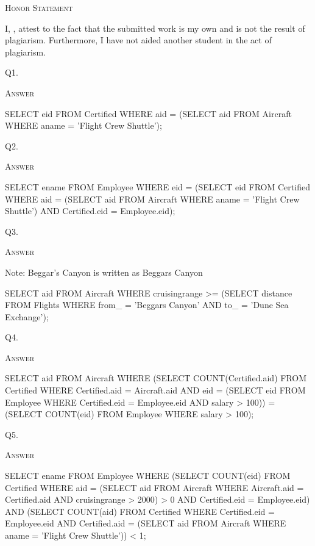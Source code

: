 



\begin{center}
  \textsc{Honor Statement}
\end{center}
I, ,
attest to the fact that the submitted work is my own and
is not the result of plagiarism.
Furthermore, I have not aided another student in the act of
plagiarism.



\newpage
Q1. 

\textsc{Answer}
\begin{answercode}
SELECT eid FROM Certified WHERE
aid = (SELECT aid FROM Aircraft WHERE aname = 'Flight Crew Shuttle');
\end{answercode}




Q2. 

\textsc{Answer}
\begin{answercode}
SELECT ename FROM Employee WHERE
eid = (SELECT eid FROM Certified WHERE
    aid = (SELECT aid FROM Aircraft WHERE
           aname = 'Flight Crew Shuttle')
       AND Certified.eid = Employee.eid);
\end{answercode}


\newpage
Q3. 

\textsc{Answer}
\begin{answercode}
Note: Beggar's Canyon is written as Beggars Canyon

SELECT aid FROM Aircraft WHERE
cruisingrange >= (SELECT distance FROM Flights WHERE
from_ = 'Beggars Canyon' AND to_ = 'Dune Sea Exchange');
\end{answercode}


Q4. 

\textsc{Answer}
\begin{answercode}
SELECT aid FROM Aircraft WHERE
(SELECT COUNT(Certified.aid) FROM Certified WHERE
Certified.aid = Aircraft.aid AND eid =
(SELECT eid FROM Employee WHERE Certified.eid = Employee.eid
AND salary > 100)) = (SELECT COUNT(eid) FROM Employee
WHERE salary > 100);
\end{answercode}


\newpage

Q5. 

\textsc{Answer}
\begin{answercode}
SELECT ename FROM Employee WHERE (SELECT COUNT(eid) FROM Certified WHERE
aid = (SELECT aid FROM Aircraft WHERE Aircraft.aid = Certified.aid
AND cruisingrange > 2000) > 0 AND Certified.eid = Employee.eid)
AND
(SELECT COUNT(aid) FROM Certified WHERE
Certified.eid = Employee.eid AND
Certified.aid = (SELECT aid FROM Aircraft WHERE
aname = 'Flight Crew Shuttle')) < 1;
\end{answercode}



